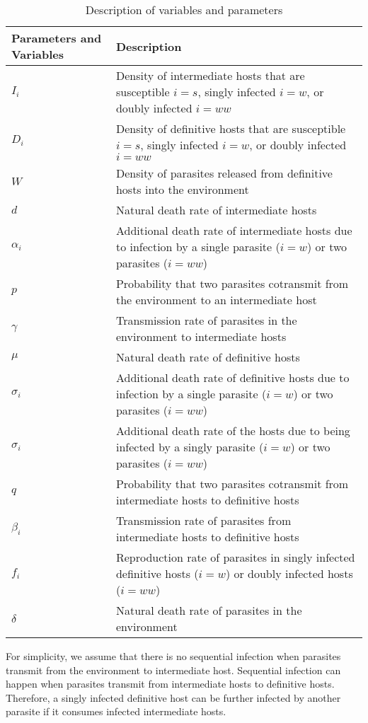 \documentclass{article}
\begin{document}
\begin{table}[!ht]
\begin{tabular}{|p{2.5cm}|p{12cm}|} 
\hline
Parameters and Variables    &  Description  \\
\hline
$I_i$  & Density of intermediate hosts that are susceptible $i=s$, singly infected $i=w$, or doubly infected $i=ww$ \\
\hline
$D_i$ & Density of definitive hosts that are susceptible $i=s$, singly infected $i=w$, or doubly infected $i=ww$ \\
\hline
$W$ & Density of parasites released from definitive hosts into the environment \\
\hline
$d$ & Natural death rate of intermediate hosts \\
\hline
$\alpha_i$ & Additional death rate of intermediate hosts due to infection by a single parasite ($i = w$) or two parasites ($i = ww$) \\
\hline
$p$ & Probability that two parasites cotransmit from the environment to an intermediate host \\
\hline
$\gamma$ & Transmission rate of parasites in the environment to intermediate hosts \\
\hline
$\mu$ & Natural death rate of definitive hosts \\
\hline
$\sigma_i$ & Additional death rate of definitive hosts due to infection by a single parasite ($i = w$) or two parasites ($i = ww$) \\
\hline
$\sigma_i$ & Additional death rate of the hosts due to being infected by a singly parasite ($i = w$) or two parasites ($i = ww$) \\
\hline
$q$ & Probability that two parasites cotransmit from intermediate hosts to definitive hosts \\
\hline
$\beta_i$ & Transmission rate of parasites from intermediate hosts to definitive hosts \\
\hline
$f_i$ & Reproduction rate of parasites in singly infected definitive hosts ($i = w$) or doubly infected hosts ($i = ww$)\\
\hline
$\delta$ & Natural death rate of parasites in the environment \\
\hline
\end{tabular}
\caption{Description of variables and parameters}
\label{table:varpardescription}
\end{table}

For simplicity, we assume that there is no sequential infection when parasites transmit from the environment to intermediate host. 
Sequential infection can happen when parasites transmit from intermediate hosts to definitive hosts. 
Therefore, a singly infected definitive host can be further infected by another parasite if it consumes infected intermediate hosts.
\end{document}
